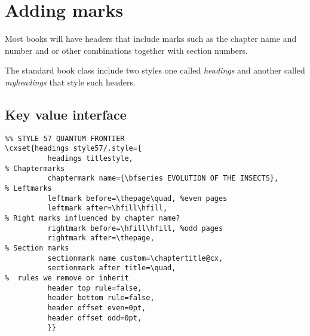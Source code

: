 \thispagestyle{samplepage}

\clearpage

\section{Adding marks}

Most books will have headers that include marks such as the chapter name and number and or other combinations together with section numbers.

The standard book class include two styles one called \textit{headings} and another called \textit{myheadings} that style such headers.




\subsection{Key value interface}
\makeatletter
{}

\makeatother









\begin{tcolorbox}
\begin{lstlisting}
%% STYLE 57 QUANTUM FRONTIER
\cxset{headings style57/.style={
          headings titlestyle,
% Chaptermarks
          chaptermark name={\bfseries EVOLUTION OF THE INSECTS},
% Leftmarks
          leftmark before=\thepage\quad, %even pages
          leftmark after=\hfill\hfill,
% Right marks influenced by chapter name?
          rightmark before=\hfill\hfill, %odd pages
          rightmark after=\thepage,
% Section marks
          sectionmark name custom=\chaptertitle@cx,
          sectionmark after title=\quad,
%  rules we remove or inherit
          header top rule=false,
          header bottom rule=false,
          header offset even=0pt,
          header offset odd=0pt,
          }}
\end{lstlisting}
\end{tcolorbox}


